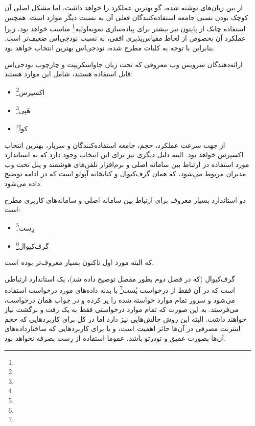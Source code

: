 از بین زبان‌های نوشته شده، گو بهترین عملکرد را خواهد داشت، اما مشکل اصلی آن کوچک بودن نسبی جامعه استفاده‌کنندگان فعلی آن به نسبت دیگر موارد است. همچنین استفاده چابک از پایتون نیز بیشتر برای پیاده‌سازی نمونه‌اولیه\footnote{} مناسب خواهد بود، زیرا عملکرد آن بخصوص از لحاظ مقیاس‌پذیری افقی، به نسبت نودجی‌اس ضعیف‌تر است. بنابراین با توجه به کلیات مطرح شده، نودجی‌اس بهترین انتخاب خواهد بود.

ارائه‌دهندگان سرویس وب معروفی که تحت زبان جاواسکریپت و چارچوب نودجی‌اس قابل استفاده هستند، شامل این موارد هستند:
\begin{itemize}
	\item اکسپرس\footnote{}
	\item هَپی\footnote{}
	\item کوآ\footnote{}
\end{itemize}

از جهت سرعت عملکرد، حجم، جامعه استفاده‌کنندگان و سربار، بهترین انتخاب اکسپرس خواهد بود. البته دلیل دیگری نیز برای این انتخاب وجود دارد که به استاندارد مورد استفاده در ارتباط بین سامانه اصلی و نرم‌افزار تلفن‌های هوشمند و پنل تحت وب مدیران مربوط می‌شود، که همان گرف‌کیوال و کتابخانه آپولو است که در ادامه توضیح داده می‌شود.\cite{express}


دو استاندارد بسیار معروف برای ارتباط بین سامانه اصلی و سامانه‌های کاربری مطرح است:

\begin{itemize}
	\item رِست\footnote{}
	\item گرف‌کیوال\footnote{}
\end{itemize}

که البته مورد اول تاکنون بسیار معروف‌تر بوده است.

گرف‌کیوال (که در فصل دوم بطور مفصل توضیح داده شد)، یک استاندارد ارتباطی است که در آن فقط از درخواست پُست\footnote{} با بدنه داده‌های مورد درخواست استفاده می‌شود و سرور تمام موارد خواسته شده را پر کرده و در جواب همان درخواست، می‌فرستد. به این صورت که تمام موارد درخواستی فقط به یک رفت و برگشت نیاز خواهند داشت. البته این روش چالش‌هایی نیز دارد اما در کل برای کاربردهایی که حجم اینترنت مصرفی در آن‌ها حائز اهمیت است، و یا برای کاربردهایی که ساختارداده‌های آن‌ها بصورت عمیق و تودرتو باشد، عموما استفاده از رِست بصرفه نخواهد بود.

